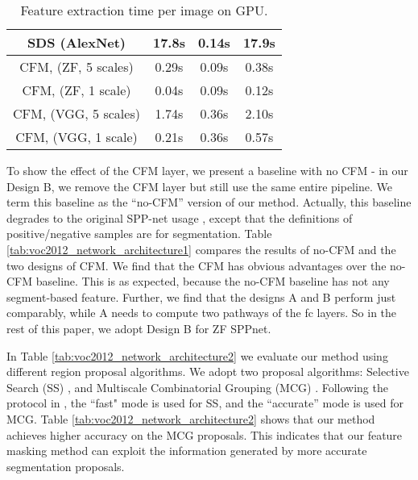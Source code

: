 \documentclass[10pt,twocolumn,letterpaper]{article}
\begin{document}
\begin{table}[t]
\begin{center}
\begin{tabular}{c|cc|c}
\hline
SDS (AlexNet) \cite{hariharan2014simultaneous}&17.8s              &0.14s              &17.9s      \\
\hline
CFM, (ZF, 5 scales)  &{0.29s}     &{0.09s}     &{0.38s}         \\
CFM, (ZF, 1 scale)  &{0.04s}     &{0.09s}     &{0.12s}         \\
CFM, (VGG, 5 scales)  & 1.74s     & 0.36s     & 2.10s      \\
CFM, (VGG, 1 scale)  & 0.21s     & 0.36s     & 0.57s      \\
\hline
\end{tabular}
\end{center}
\caption{Feature extraction time per image on GPU.}
\label{fig:voc2012_speed}
\end{table}

To show the effect of the CFM layer, we present a baseline with no CFM - in our Design B, we remove the CFM layer but still use the same entire pipeline. We term this baseline as the ``no-CFM'' version of our method.
Actually, this baseline degrades to the original SPP-net usage \cite{he2014spatial}, except that
the definitions of positive/negative samples are for segmentation. Table \ref{tab:voc2012_network_architecture1} compares the results of no-CFM and the two designs of CFM. We find that the CFM has obvious advantages over the no-CFM baseline. This is as expected, because the no-CFM baseline has not any segment-based feature. Further, we find that the designs A and B perform just comparably, while A needs to compute two pathways of the fc layers. So in the rest of this paper, we adopt Design B for ZF SPPnet.

In Table \ref{tab:voc2012_network_architecture2} we evaluate our method using different region proposal algorithms. We adopt two proposal algorithms: Selective Search (SS) \cite{uijlings2013selective}, and Multiscale Combinatorial Grouping (MCG) \cite{arbelaez2014multiscale}.
Following the protocol in \cite{hariharan2014simultaneous}, the ``fast" mode is used for SS, and the ``accurate'' mode is used for MCG. Table \ref{tab:voc2012_network_architecture2} shows that our method achieves higher accuracy on the MCG proposals. This indicates that our feature masking method can exploit the information generated by more accurate segmentation proposals.
\end{document}
